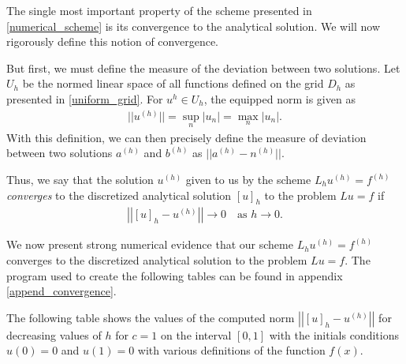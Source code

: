 The single most important property of the scheme presented in
\eqref{numerical_scheme} is its convergence to the analytical solution. We will
now rigorously define this notion of convergence.

But first, we must define the measure of the deviation between two solutions.
Let $U_h$ be the normed linear space of all functions defined on the grid $D_h$
as presented in \eqref{uniform_grid}. For $u^{h} \in U_h$, the equipped norm is
given as
\begin{align}\label{norm}
  ||u^{(h)}|| = \sup_n |u_n| = \max_n |u_n|.
\end{align}
With this definition, we can then precisely define the measure of deviation
between two solutions $a^{(h)}$ and $b^{(h)}$ as $||a^{(h)} - n^{(h)}||$.

Thus, we say that the solution $u^{(h)}$ given to us by the
scheme $L_h u^{(h)} = f^{(h)}$ \textit{converges} to the discretized analytical
solution $[u]_h$ to the problem $Lu = f$ if
\begin{align}\label{convergence_def}
  \left|\left|[u]_h - u^{(h)}\right|\right| \to 0 \quad \text{as $h \to 0$}.
\end{align}

We now present strong numerical evidence that our scheme $L_h u^{(h)} = f^{(h)}$
converges to the discretized analytical solution to the problem $Lu = f$. The
program used to create the following tables can be found in appendix \ref{append_convergence}.

The following table shows the values of the computed norm $\left|\left|[u]_h - u^{(h)}\right|\right|$ for
decreasing values of $h$ for $c=1$ on the interval $[0, 1]$ with the
initials conditions $u(0) = 0$ and $u(1) = 0$ with various definitions of
the function $f(x)$.

